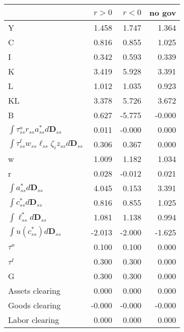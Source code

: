 \begin{tabular}{lrrr}
\toprule
 & $r>0$ & $r<0$ & no gov \\
\midrule
Y & 1.458 & 1.747 & 1.364 \\
C & 0.816 & 0.855 & 1.025 \\
I & 0.342 & 0.593 & 0.339 \\
K & 3.419 & 5.928 & 3.391 \\
L & 1.012 & 1.035 & 0.923 \\
KL & 3.378 & 5.726 & 3.672 \\
B & 0.627 & -5.775 & -0.000 \\
$\int \tau^{a}_{ss}r_{ss}a^{*}_{ss}d\mathbf{D}_{ss}$ & 0.011 & -0.000 & 0.000 \\
$\int \tau^{\ell}_{ss}w_{ss}\ell_{ss}\zeta_{i}z_{ss}d\mathbf{D}_{ss}$ & 0.306 & 0.367 & 0.000 \\
w & 1.009 & 1.182 & 1.034 \\
r & 0.028 & -0.012 & 0.021 \\
$\int a^{*}_{ss} d\mathbf{D}_{ss}$ & 4.045 & 0.153 & 3.391 \\
$\int c^{*}_{ss} d\mathbf{D}_{ss}$ & 0.816 & 0.855 & 1.025 \\
$\int \ell^{*}_{ss} d\mathbf{D}_{ss}$ & 1.081 & 1.138 & 0.994 \\
$\int u \left(c^{*}_{ss} \right) d\mathbf{D}_{ss}$ & -2.013 & -2.000 & -1.625 \\
$\tau^{a}$ & 0.100 & 0.100 & 0.000 \\
$\tau^{\ell}$ & 0.300 & 0.300 & 0.000 \\
G & 0.300 & 0.300 & 0.000 \\
Assets clearing & 0.000 & 0.000 & 0.000 \\
Goods clearing & -0.000 & -0.000 & -0.000 \\
Labor clearing & 0.000 & 0.000 & 0.000 \\
\bottomrule
\end{tabular}
